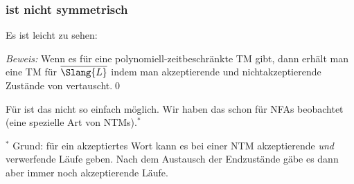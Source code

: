 \documentclass[aspectratio=1610,onlymath]{beamer}
\begin{document}
\begin{frame}\frametitle{ ist nicht symmetrisch}

Es ist leicht zu sehen:


\emph{Beweis:} Wenn es für  eine polynomiell-zeitbeschränkte TM 
gibt, dann erhält man eine TM für $\overline{\Slang{L}}$ indem man akzeptierende
und nichtakzeptierende Zustände von  vertauscht.\qed
\medskip\pause

Für  ist das nicht so einfach möglich. Wir haben das schon für NFAs beobachtet (eine spezielle Art von NTMs).${}^*$



\medskip

{\tiny ${}^*$ Grund: für ein akzeptiertes Wort kann es bei einer NTM akzeptierende \emph{und} verwerfende Läufe geben. Nach dem Austausch der Endzustände gäbe es dann aber immer noch akzeptierende Läufe.\\
}

\end{frame}


\newcommand{\ppred}[1]{\color{myred}{\text{r}_{#1}}\color{text}{}}
\newcommand{\pgreen}[1]{\color{mygreen}{\text{g}_{#1}}\color{text}{}}
\newcommand{\pblue}[1]{\color{myblue}{\text{b}_{#1}}\color{text}{}}
\end{document}
